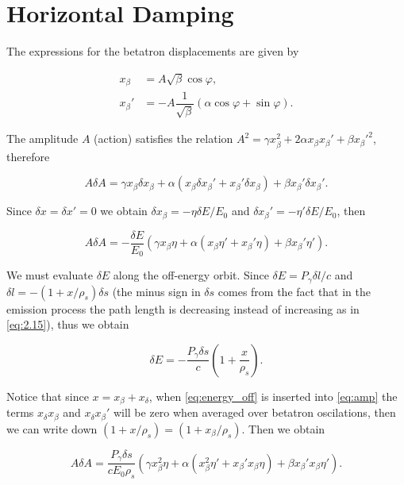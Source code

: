 \section{Horizontal Damping}\label{sec:hor_damping}

The expressions for the betatron displacements are given by

\begin{align}
x_\beta &= A\sqrt{\beta} \cos\varphi, \\
x_\beta'& = - A\dfrac{1}{\sqrt{\beta}} \left(\alpha\cos\varphi + \sin\varphi\right).
\end{align}

The amplitude $A$ (action) satisfies the relation $A^2 = \gamma x_\beta^2 + 2\alpha x_\beta x_\beta' + \beta x_\beta'^2$, therefore

\[
A\delta A = \gamma x_\beta \delta x_\beta + \alpha \left(x_\beta \delta x_\beta' + x_\beta' \delta x_\beta\right)  + \beta x_\beta'\delta x_\beta'.
\]

Since $\delta x = \delta x' = 0$ we obtain $\delta x_\beta = - \eta \delta E / E_0$ and $\delta x_\beta' = - \eta' \delta E / E_0$, then

\begin{equation}
A\delta A = -\dfrac{\delta E}{E_0} \left(\gamma x_\beta \eta + \alpha \left(x_\beta \eta' + x_\beta' \eta\right)  + \beta x_\beta'\eta'\right).
\label{eq:amp}
\end{equation}

We must evaluate $\delta E$ along the off-energy orbit. Since $\delta E = P_\gamma \delta l / c$ and $\delta l = -(1 + x / \rho_s) \delta s$
(the minus sign in $\delta s$ comes from the fact that in the emission process the path length is decreasing instead of increasing as in \eqref{eq:2.15}), thus we obtain

\begin{equation}
\delta E = -\dfrac{P_\gamma \delta s}{c} \left(1 + \dfrac{x}{\rho_s}\right).
\label{eq:energy_off}
\end{equation}

Notice that since $x = x_\beta + x_\delta$, when \eqref{eq:energy_off} is inserted into \eqref{eq:amp} the terms $x_\delta x_\beta$ and $x_\delta x_\beta'$
will be zero when averaged over betatron oscilations, then we can write down $(1 + x/\rho_s) = (1 + x_\beta / \rho_s)$. Then we obtain

\[
A\delta A = \dfrac{P_\gamma \delta s}{c E_0 \rho_s} \left(\gamma x_\beta^2 \eta + \alpha \left(x_\beta^2 \eta' + x_\beta' x_\beta  \eta\right)  + \beta x_\beta' x_\beta \eta'\right).
\]

